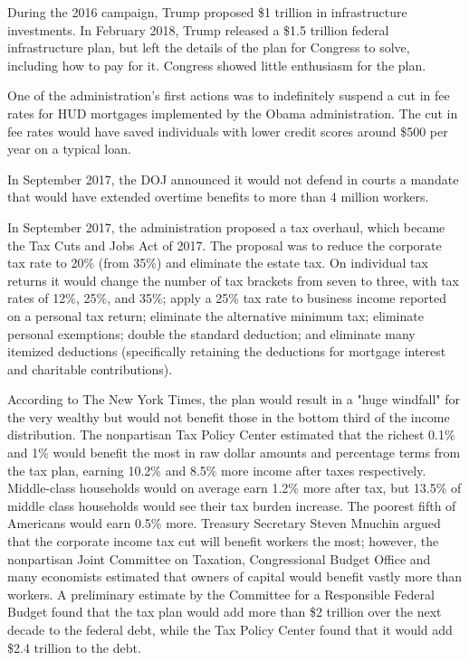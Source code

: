 During the 2016 campaign, Trump proposed \$1 trillion in infrastructure
investments. In February 2018, Trump released a \$1.5 trillion federal
infrastructure plan, but left the details of the plan for Congress to
solve, including how to pay for it. Congress showed little enthusiasm
for the plan.

One of the administration's first actions was to indefinitely suspend a
cut in fee rates for HUD mortgages implemented by the Obama
administration. The cut in fee rates would have saved individuals with
lower credit scores around \$500 per year on a typical loan.

In September 2017, the DOJ announced it would not defend in courts a
mandate that would have extended overtime benefits to more than 4
million workers.

In September 2017, the administration proposed a tax overhaul, which
became the Tax Cuts and Jobs Act of 2017. The proposal was to reduce the
corporate tax rate to 20\% (from 35\%) and eliminate the estate tax. On
individual tax returns it would change the number of tax brackets from
seven to three, with tax rates of 12\%, 25\%, and 35\%; apply a 25\% tax
rate to business income reported on a personal tax return; eliminate the
alternative minimum tax; eliminate personal exemptions; double the
standard deduction; and eliminate many itemized deductions (specifically
retaining the deductions for mortgage interest and charitable
contributions).

According to The New York Times, the plan would result in a "huge
windfall" for the very wealthy but would not benefit those in the bottom
third of the income distribution. The nonpartisan Tax Policy Center
estimated that the richest 0.1\% and 1\% would benefit the most in raw
dollar amounts and percentage terms from the tax plan, earning 10.2\%
and 8.5\% more income after taxes respectively. Middle-class households
would on average earn 1.2\% more after tax, but 13.5\% of middle class
households would see their tax burden increase. The poorest fifth of
Americans would earn 0.5\% more. Treasury Secretary Steven Mnuchin
argued that the corporate income tax cut will benefit workers the most;
however, the nonpartisan Joint Committee on Taxation, Congressional
Budget Office and many economists estimated that owners of capital would
benefit vastly more than workers. A preliminary estimate by the
Committee for a Responsible Federal Budget found that the tax plan would
add more than \$2 trillion over the next decade to the federal debt,
while the Tax Policy Center found that it would add \$2.4 trillion to
the debt.

